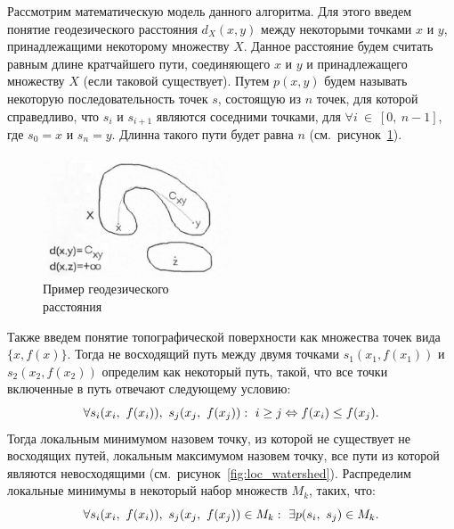 \documentclass[14pt, a4paper]{extreport}
\begin{document}
	Рассмотрим математическую модель данного алгоритма. Для этого введем понятие геодезического расстояния $d_X(x,y)$ между некоторыми точками $x$ и $y$, принадлежащими некоторому множеству $X$. Данное расстояние будем считать равным длине кратчайшего пути, соединяющего $x$ и $y$ и принадлежащего множеству $X$ (если таковой существует). Путем $p(x,y)$ будем называть некоторую последовательность точек $s$, состоящую из $n$ точек, для которой справедливо, что $s_i$ и $s_{i+1}$ являются соседними точками, для $\forall i~\in~[0,~n-1]$, где $s_0 = x$ и $s_n = y$. Длинна такого пути будет равна $n$ (см.~рисунок~\ref{fig:gerodesic_distance}).
	
	\begin{figure}[h!]
		\centering
		\includegraphics[width = 0.5\textwidth]{image/chapter_2/gerodesic_distance}	
		\caption{Пример геодезического \\ расстояния}
		\label{fig:gerodesic_distance}
	\end{figure}
	Также введем понятие топографической поверхности как множества точек вида $\{x, f(x)\}$. Тогда не восходящий путь между двумя точками $s_1(x_1,f(x_1))$ и $s_2(x_2,f(x_2))$ определим как некоторый путь, такой, что все точки включенные в путь отвечают следующему условию:\vspace*{-0.3cm}
	\begin{equation*}
		\forall s_i(x_i,~f(x_i)),~s_j(x_j,~f(x_j)):~i\ge j \Leftrightarrow f(x_i) \le f(x_j).
		\vspace*{-0.3cm}
		\label{z_X(Y_i)}
	\end{equation*}
	Тогда локальным минимумом назовем точку, из которой не существует не восходящих путей, локальным максимумом назовем точку, все пути из которой являются невосходящими (см.~рисунок~\ref{fig:loc_watershed}). Распределим локальные минимумы в некоторый набор множеств $M_k$, таких, что:\vspace*{-0.3cm}
	\begin{equation*}
		\forall s_i(x_i,~f(x_i)),~s_j(x_j,~f(x_j)) \in M_k:~\exists p(s_i,~s_j) \in M_k.
		\vspace*{-0.3cm}
		\label{z_X(Y_i)}
	\end{equation*}
	
\end{document}
